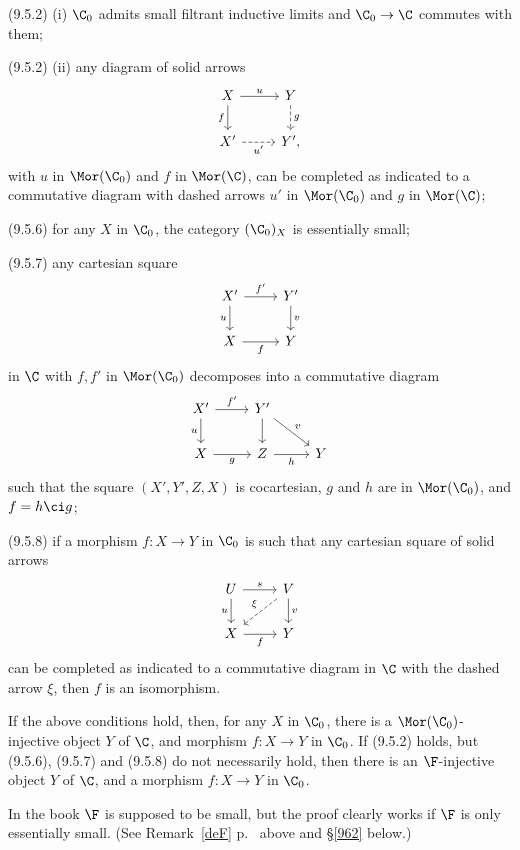 \documentclass[12pt]{article}
\theoremstyle{remark}
\theoremstyle{definition}
\begin{document}
\nn(9.5.2) (i) $\C_0$ admits small filtrant inductive limits and $\C_0\to\C$ commutes with them;

\nn(9.5.2) (ii) any diagram of solid arrows
$$
\begin{tikzcd}
X\ar{d}[swap]{f}\ar{r}{u}&Y\ar[dashed]{d}{g}\\ 
X'\ar[dashed]{r}[swap]{u'}&Y',
\end{tikzcd}
$$ 
with $u$ in $\Mor(\C_0)$ and $f$ in $\Mor(\C)$, can be completed as indicated to a commutative diagram with dashed arrows $u'$ in $\Mor(\C_0)$ and $g$ in $\Mor(\C)$; 

\nn(9.5.6) for any $X$ in $\C_0$, the category $(\C_0)_X$ is essentially small;

\nn(9.5.7) any cartesian square 
$$
\begin{tikzcd}
X'\ar{d}[swap]{u}\ar{r}{f'}&Y'\ar{d}{v}\\ 
X\ar{r}[swap]{f}&Y
\end{tikzcd}
$$ 
in $\C$ with $f,f'$ in $\Mor(\C_0)$ decomposes into a commutative diagram 
$$
\begin{tikzcd}
X'\ar{d}[swap]{u}\ar{r}{f'}&Y'\ar{d}\ar{rd}{v}\\ 
X\ar{r}[swap]{g}&Z\ar{r}[swap]{h}&Y
\end{tikzcd}
$$ 
such that the square $(X',Y',Z,X)$ is cocartesian, $g$ and $h$ are in $\Mor(\C_0)$, and $f=h\ci g$; 

\nn(9.5.8) if a morphism $f:X\to Y$ in $\C_0$ is such that any cartesian square of solid arrows
$$
\begin{tikzcd}
U\ar{d}[swap]{u}\ar{r}{s}&V\ar{d}{v}\ar[dashed]{ld}[swap]{\xi}\\ 
X\ar{r}[swap]{f}&Y
\end{tikzcd}
$$ 
can be completed as indicated to a commutative diagram in $\C$ with the dashed arrow $\xi$, then $f$ is an isomorphism. 
\begin{thm} 
If the above conditions hold, then, for any $X$ in $\C_0$, there is a $\Mor(\C_0)$-injective object $Y$ of $\C$, and morphism $f:X\to Y$ in $\C_0$. If (9.5.2) holds, but (9.5.6), (9.5.7) and (9.5.8) do not necessarily hold, then there is an $\F$-injective object $Y$ of $\C$, and a morphism $f:X\to Y$ in $\C_0$.
\end{thm}

\begin{rk}
In the book $\F$ is supposed to be small, but the proof clearly works if $\F$ is only essentially small. (See Remark~\ref{deF} p.~ above and \S\ref{962} below.)
\end{rk}
\end{document}

